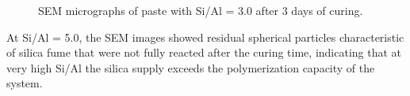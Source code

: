 \begin{figure}[H]
  \centering
  \caption{SEM micrographs of paste with Si/Al = 3.0 after 3 days of curing.}
  \label{fig:si_al_3-0_spot3_sem}
\end{figure}

At Si/Al = 5.0, the SEM images showed residual spherical particles characteristic of silica fume that were not fully reacted after the curing time, indicating that at very high Si/Al the silica supply exceeds the polymerization capacity of the system.


